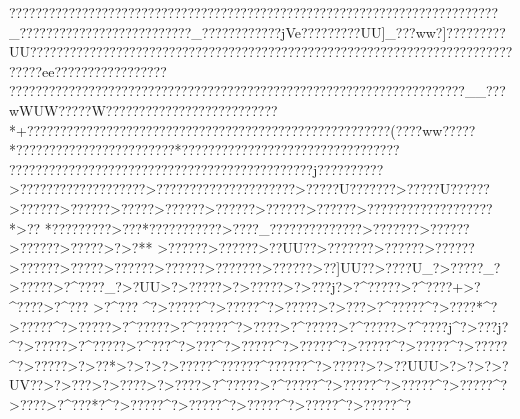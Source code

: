 {{{{{{{{{{{{{{{{{{{{{{{{{{{{{{{{{{{{{{{{{{{{{{{{{{{{{{{{{{{{{{{{{{{{{{{{{{{{{{{{{{{{{{{{{{{{{{{{{{{{{{{{{{{{{{{{{{{{{{{{{{{{{{{{{{{{{{{{{{{{{{{{{{{{{{{{{{{{{{{{{{{{{{{{{{{{{{{{{{{{{{{{{{{{{{{{{{{{{{{{{{{{{{{{{{{{{{{{{{{{{{{{{{{{{{{{{{{{{{{{{{{{{{{{{{{{{{{{{{{{{{{{{{{{{{{{{{{{{{{{{{{{{{{{{{{{{{{{{{{{{{{{{{{{{{{{{{{{{{{{{{{{{{{{{{{{{{{{{{{{{{{{{{{{{{{{{{{{{{{{{{{{{{{{{{{{{{{{{{{{{{{{{{{{{{{{{{{{{{{{{{{{{{{{{{{{{{{{{{{{{{{{{{{{{{{{{{{{{{{{{{{{{{{{{{{{{{{{{{{{{{{{{{{{{{{{{{{{{{{{{{{{{{{{{{{{{{{{{{{{{{{{{{{{{{{{{{{{{{{{{{{{{{{{{{{{{{{{{{{{{{{{{{{{{{{{{{{{{{{{{{{{{{{{{{{{{{{{{{{{{{{{{{{{{{{{{{{{{{{{{{{{{{{{{{{{{{{{{{{{{{{{{{{{{{{{{{{{{{{{{{{{{{{{{{{{{{{{{{{{{{{{{{{{{{{{{{{{{{{{{{{{{{{{{{{{{{{{{{{{{{{{{{{{{{{{{{{{{{{{{{{{{{{{{{{{{{{{{{{{{{{{{{{{{{{{{{{{{{{{{{{{{{{{{{{{{{{{{{{{{{{{{{{{{{{{{{{{{{{{{{{{{{{{{{{{{{{{{{{{{{{{{{{{{{{{{{{{{{{{{{{{{{{{{{{{{{{{{{{{{{{{{{{{{{{{{{{{{{{{{{{{{{{{{{{{{{{{{{{{{{{{{{{{{{{{{{{{{{{{{{{{{{{{{{{{{{{{{{{{{{{{{{{{{{{{{{{{{{{{{{{{{{{{{{{{{{{{{{{{{{{{{{{{{{{{{{{{{{{{{{{{{{{{{{{{{{{{{{{{{{{{{{{{{{{{{{{{{{{{{{{{{{{{{{{{{{{{{{{{{{{{{{{{{{{{{{{{{{{{{{{{{{{{{{{{{{{{{{{{{{{{{{{{{{{{{{{{{{{{{{{{{{{{{{{{{{{{{{{{{{{{{{{{{{{{{{{{{{{{{{{{{{{{{{{{{{{{{{{{{{{{{{{{{{{{{{{{{{{{{{{{{{{{{{{{{{{{{{{{{{{{{{{{{{{{{{{{{{{{{{{{{{{{{{{{{{{{{{{{{{{{{{{{{{{{{{{{{{{{{{{{{{{{{{{{{{{{{{{{{{{{{{{{{{{{{{{{{{{{{{{{{{{{{{{{{{{{{{{{{{{{{{{{{{{{{{{{{{{{{{{{{{{{{{{{{{{{{{{{{{{{{{{{{{{{{{{{{{{{{{{{{{{{{{{{{{{{{{{{{{{{{{{{{{{{{{{{{{{{{{{{{{{{{{{{{{{{{{{{{{{{{{{{{{{{{{{{{{{{{{{{{{{{{{{{{{{{{{{{{{{{{{{{{{{{{{{{{{{{{{{{{{{{{{{{{{{{{{{{{{{{{{{{{{{{{{{{{{{{{{{{{{{{{{{{{{{{{{{{{{{{{{{{{{{{{{{{{{{{{{{{{{{{{{{{{{{{{{{{{{{{{{{{{{{{{{{{{{{{{{{{{{{{{{{{{{{{{{{{{{{{{{{{{{{{{{{{{{{{{{{{{{{{{{{{{{{{{{{{{{{{{{{{{{{{{{{{{{{{{{{{{{{{{{{{{{{{{{{{{{{{{{{{{{{{{{{{{{{{{{{{{{{{{{{{{{{{{{{{{{{{{{{{{{{{{{{{{{{{{{{{{{{{{{{{{{{{{{{{{{{{{{{{{{{{{{{{{{{{{{{{{{{{{{{{{{{{{{{{\??????????   ?????????????????????????????????????????????????????????????????_??????????????????????????}_???????}?????jVe?????????UU]_???ww?]?????????UU??????????????????????????????????????????????????????????????????????????????ee??????????????????????????????????????????????????????????????????????????????????????__???wWUW?????W???????????    ????   ???????????
*+???   ??? ?????????????????????????????????????????????????(????ww?????*????????????????????????*?????????????????????????????????
??????????????????????????????????????????????j??????????>???????????????????>?????????????????????>?????U???????>?????U??????>??????>??????>?????>??????>??????>??????>??????>???????????????????*>??
*?????????>???*???????????>????_??????????????>???????>??????>??????>?????>?>?**
>??????>??????>??UU??>???????>??????>??????>??????>?????>??????>??????>???????>??????>??]UU??>????U_?>?????_?>?????>?^???? _?>?UU>?>?????>?>?????>?>???j?>?^?????>?^????+>?^????>?^???
 >?^???
 ^?>?????^?>?????^?>?????>?>???  >?^?????^?>????*^?>?????^?>?????>?^?????>?^?????^?>????>?^?????>?^?????>?^????j^?>???j?^?>?????>?^?????>?^??? ^?>???^?>?????^?>?????^?>?????^?>?????^?>?????^?>?????>?>??*  >?>?    >?>?????^??????^??????^?>?????>?>??UUU>?>?    >?>?UV??>?>?? ? >?>???? >?>????>?^?????>?^?????^?>?????^?>?????^?>?????^?>????>?^???*?^?>?????^?>?????^?>?????^?>?????^?>?????^?}}}}}}}}}}}}}}}}}}}}}}}}}}}}}}}}}}}}}}}}}}}}}}}}}}}}}}}}}}}}}}}}}}}}}}}}}}}}}}}}}}}}}}}}}}}}}}}}}}}}}}}}}}}}}}}}}}}}}}}}}}}}}}}}}}}}}}}}}}}}}}}}}}}}}}}}}}}}}}}}}}}}}}}}}}}}}}}}}}}}}}}}}}}}}}}}}}}}}}}}}}}}}}}}}}}}}}}}}}}}}}}}}}}}}}}}}}}}}}}}}}}}}}}}}}}}}}}}}}}}}}}}}}}}}}}}}}}}}}}}}}}}}}}}}}}}}}}}}}}}}}}}}}}}}}}}}}}}}}}}}}}}}}}}}}}}}}}}}}}}}}}}}}}}}}}}}}}}}}}}}}}}}}}}}}}}}}}}}}}}}}}}}}}}}}}}}}}}}}}}}}}}}}}}}}}}}}}}}}}}}}}}}}}}}}}}}}}}}}}}}}}}}}}}}}}}}}}}}}}}}}}}}}}}}}}}}}}}}}}}}}}}}}}}}}}}}}}}}}}}}}}}}}}}}}}}}}}}}}}}}}}}}}}}}}}}}}}}}}}}}}}}}}}}}}}}}}}}}}}}}}}}}}}}}}}}}}}}}}}}}}}}}}}}}}}}}}}}}}}}}}}}}}}}}}}}}}}}}}}}}}}}}}}}}}}}}}}}}}}}}}}}}}}}}}}}}}}}}}}}}}}}}}}}}}}}}}}}}}}}}}}}}}}}}}}}}}}}}}}}}}}}}}}}}}}}}}}}}}}}}}}}}}}}}}}}}}}}}}}}}}}}}}}}}}}}}}}}}}}}}}}}}}}}}}}}}}}}}}}}}}}}}}}}}}}}}}}}}}}}}}}}}}}}}}}}}}}}}}}}}}}}}}}}}}}}}}}}}}}}}}}}}}}}}}}}}}}}}}}}}}}}}}}}}}}}}}}}}}}}}}}}}}}}}}}}}}}}}}}}}}}}}}}}}}}}}}}}}}}}}}}}}}}}}}}}}}}}}}}}}}}}}}}}}}}}}}}}}}}}}}}}}}}}}}}}}}}}}}}}}}}}}}}}}}}}}}}}}}}}}}}}}}}}}}}}}}}}}}}}}}}}}}}}}}}}}}}}}}}}}}}}}}}}}}}}}}}}}}}}}}}}}}}}}}}}}}}}}}}}}}}}}}}}}}}}}}}}}}}}}}}}}}}}}}}}}}}}}}}}}}}}}}}}}}}}}}}}}}}}}}}}}}}}}}}}}}}}}}}}}}}}}}}}}}}}}}}}}}}}}}}}}}}}}}}}}}}}}}}}}}}}}}}}}}}}}}}}}}}}}}}}}}}}}}}}}}}}}}}}}}}}}}}}}}}}}}}}}}}}}}}}}}}}}}}}}}}}}}}}}}}}}}}}}}}}}}}}}}}}}}}}}}}}}}}}}}}}}}}}}}}}}}}}}}}}}}}}}}}}}}}}}}}}}}}}}}}}}}}}}}}}}}}}}}}}}}}}}}}}}}}}}}}}}}}}}}}}}}}}}}}}}}}}}}}}}}}}}}}}}}}}}}}}}}}}}}}}}}}}}}}}}}}}}}}}}}}}}}}}}}}}}}}}}}}}}}}}}}}}}}}}}}}}}}}}}}}}}}}}}}}}}}}}}}}}}}}}}}}}}}}}}}}}}}}}}}}}}}}}}}}}}}}}}}}}}}}}}}}}}}}}}}}}}}}}}}}}}}}}}}}}}}}}}}}}}}}}}}}}}}}}}}}}}}}}}}}}}}}}}}}}}}}}}}}}}}}}}}}}}}}}}}}}}}}}}}}}}}}}}}}}}}}}}}}}}}}}}}}}}}}}}}}}}}}}}}}}}}}}}}}}}}}}}}}}}}}}}}}}}}}}}}}}}}}}}}}}}}}}}}}}}}}}}}}}}}}}}}}}}}}}}}}}}}}}}}}}}}}}}}}}}}}}}}}}}}}}}}}}}}}}}}}}}}}}}}}}}}}}}}}}}}}}}}}}}}}}}}}}}}}}}}}}}}}}}}}}}}
